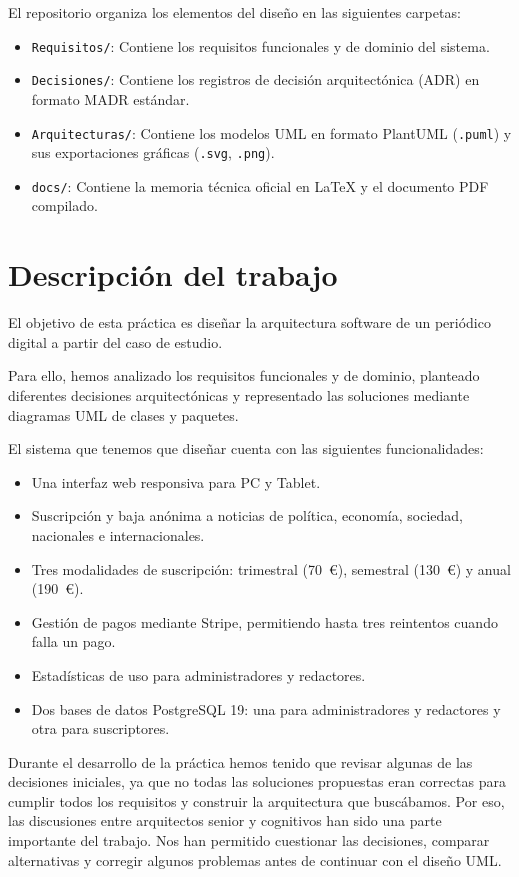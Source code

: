 El repositorio organiza los elementos del diseño en las siguientes carpetas:

\begin{itemize}[leftmargin=*]
    \item \texttt{Requisitos/}: Contiene los requisitos funcionales y de dominio del sistema.
    \item \texttt{Decisiones/}: Contiene los registros de decisión arquitectónica (ADR) en formato MADR estándar.
    \item \texttt{Arquitecturas/}: Contiene los modelos UML en formato PlantUML (\texttt{.puml}) y sus exportaciones gráficas (\texttt{.svg}, \texttt{.png}).
    \item \texttt{docs/}: Contiene la memoria técnica oficial en LaTeX y el documento PDF compilado.
\end{itemize}

\section{Descripción del trabajo}

El objetivo de esta práctica es diseñar la arquitectura software de un periódico digital a partir del caso de estudio.

Para ello, hemos analizado los requisitos funcionales y de dominio, planteado diferentes decisiones arquitectónicas y representado las soluciones mediante diagramas UML de clases y paquetes.

El sistema que tenemos que diseñar cuenta con las siguientes funcionalidades:

\begin{itemize}[leftmargin=*]
    \item Una interfaz web responsiva para PC y Tablet.
    \item Suscripción y baja anónima a noticias de política, economía, sociedad, nacionales e internacionales.
    \item Tres modalidades de suscripción: trimestral (70~€), semestral (130~€) y anual (190~€).
    \item Gestión de pagos mediante Stripe, permitiendo hasta tres reintentos cuando falla un pago.
    \item Estadísticas de uso para administradores y redactores.
    \item Dos bases de datos PostgreSQL 19: una para administradores y redactores y otra para suscriptores.
\end{itemize}

Durante el desarrollo de la práctica hemos tenido que revisar algunas de las decisiones iniciales, ya que no todas las soluciones propuestas eran correctas para cumplir todos los requisitos y construir la arquitectura que buscábamos. Por eso, las discusiones entre arquitectos senior y cognitivos han sido una parte importante del trabajo. Nos han permitido cuestionar las decisiones, comparar alternativas y corregir algunos problemas antes de continuar con el diseño UML.

